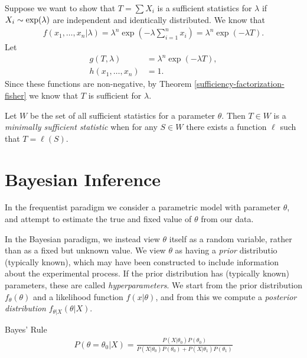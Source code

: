 \begin{exmp}
    Suppose we want to show that $T = \sum X_i$ is a sufficient statistics for $\lambda$ if $X_i \sim \textrm{exp}(\lambda)$ are independent and identically distributed. We know that
    \begin{align*}
        f(x_1, \ldots, x_n|\lambda) = \lambda^n\exp\left(-\lambda\sum_{i=1}^{n}x_i\right) = \lambda^n\exp\left(-\lambda T\right).
    \end{align*}
    Let
    \begin{align*}
        g(T,\lambda) &= \lambda^n\exp\left(-\lambda T\right), \\
        h(x_1, \ldots, x_n) &= 1.
    \end{align*}
    Since these functions are non-negative, by Theorem \ref{sufficiency-factorization-fisher} we know that $T$ is sufficient for $\lambda$.
\end{exmp}

\begin{defn}
    Let $W$ be the set of all sufficient statistics for a parameter $\theta$. Then $T \in W$ is a \emph{minimally sufficient statistic} when for any $S \in W$ there exists a function $\ell$ such that $T = \ell(S)$.
\end{defn}

\section{Bayesian Inference}

\begin{rmk}
    In the frequentist paradigm we consider a parametric model with parameter $\theta$, and attempt to estimate the true and fixed value of $\theta$ from our data.

    In the Bayesian paradigm, we instead view $\theta$ itself as a random variable, rather than as a fixed but unknown value. We view $\theta$ as having a \emph{prior} distributio (typically known), which may have been constructed to include information about the experimental process. If the prior distribution has (typically known) parameters, these are called \emph{hyperparameters}. We start from the prior distribution $f_{\theta}(\theta)$ and a likelihood function $f(x|\theta)$, and from this we compute a \emph{posterior distribution} $f_{\theta|X}(\theta|X)$.
\end{rmk}

\begin{defn}{Bayes' Rule}\proofbreak
    \begin{align*}
        P\left(\theta = \theta_0|X\right) = \frac{P\left(X|\theta_0\right)P(\theta_0)}{P\left(X|\theta_0\right)P(\theta_0) + P\left(X|\theta_1\right)P(\theta_1)}
    \end{align*}
\end{defn}

